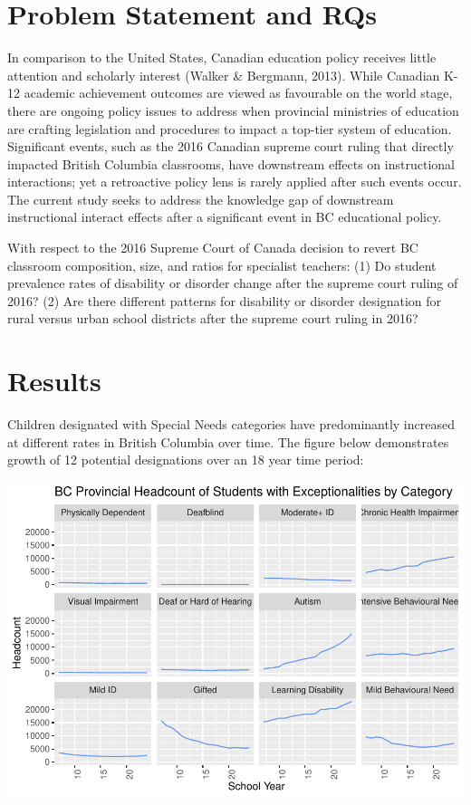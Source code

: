 \documentclass[
  english,
  man]{apa6}
\begin{document}
\hypertarget{problem-statement-and-rqs}{%
\section{Problem Statement and RQs}\label{problem-statement-and-rqs}}

In comparison to the United States, Canadian education policy receives little attention and scholarly interest (Walker \& Bergmann, 2013). While Canadian K-12 academic achievement outcomes are viewed as favourable on the world stage, there are ongoing policy issues to address when provincial ministries of education are crafting legislation and procedures to impact a top-tier system of education. Significant events, such as the 2016 Canadian supreme court ruling that directly impacted British Columbia classrooms, have downstream effects on instructional interactions; yet a retroactive policy lens is rarely applied after such events occur. The current study seeks to address the knowledge gap of downstream instructional interact effects after a significant event in BC educational policy.

With respect to the 2016 Supreme Court of Canada decision to revert BC classroom composition, size, and ratios for specialist teachers:
(1) Do student prevalence rates of disability or disorder change after the supreme court ruling of 2016?
(2) Are there different patterns for disability or disorder designation for rural versus urban school districts after the supreme court ruling in 2016?

\hypertarget{results}{%
\section{Results}\label{results}}

Children designated with Special Needs categories have predominantly increased at different rates in British Columbia over time. The figure below demonstrates growth of 12 potential designations over an 18 year time period:

\includegraphics{draft_play_files/figure-latex/sandbox-1.pdf}
\end{document}

